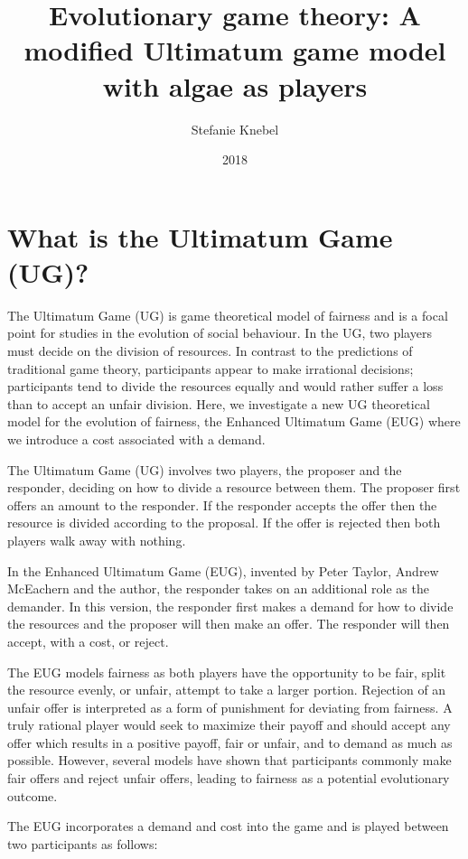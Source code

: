 \documentclass[]{article}
\title{Evolutionary game theory: A modified Ultimatum game model with algae as
players}
\author{Stefanie Knebel}
\date{2018}
\begin{document}
\maketitle

\section{What is the Ultimatum Game
(UG)?}\label{what-is-the-ultimatum-game-ug}

The Ultimatum Game (UG) is game theoretical model of fairness and is a
focal point for studies in the evolution of social behaviour. In the UG,
two players must decide on the division of resources. In contrast to the
predictions of traditional game theory, participants appear to make
irrational decisions; participants tend to divide the resources equally
and would rather suffer a loss than to accept an unfair division. Here,
we investigate a new UG theoretical model for the evolution of fairness,
the Enhanced Ultimatum Game (EUG) where we introduce a cost associated
with a demand.

The Ultimatum Game (UG) involves two players, the proposer and the
responder, deciding on how to divide a resource between them. The
proposer first offers an amount to the responder. If the responder
accepts the offer then the resource is divided according to the
proposal. If the offer is rejected then both players walk away with
nothing.

In the Enhanced Ultimatum Game (EUG), invented by Peter Taylor, Andrew McEachern and the author, the responder takes on an additional role as the
demander. In this version, the responder first makes a demand for how to
divide the resources and the proposer will then make an offer. The
responder will then accept, with a cost, or reject.

The EUG models fairness as both players have the opportunity to be fair,
split the resource evenly, or unfair, attempt to take a larger portion.
Rejection of an unfair offer is interpreted as a form of punishment for
deviating from fairness. A truly rational player would seek to maximize
their payoff and should accept any offer which results in a positive
payoff, fair or unfair, and to demand as much as possible. However,
several models have shown that participants commonly make fair offers
and reject unfair offers, leading to fairness as a potential
evolutionary outcome.

The EUG incorporates a demand and cost into the game and is played
between two participants as follows:
\end{document}
